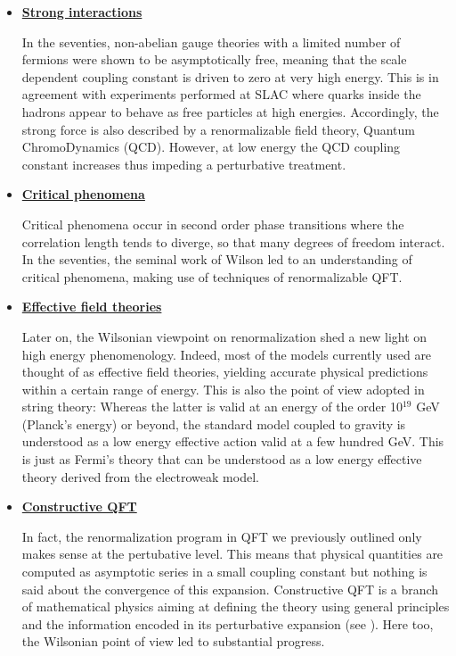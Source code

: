 \documentclass[10pt,here,feynmf]{article}
\begin{document}
\begin{itemize}
\item
\underline{\bf Strong interactions}

In the seventies, non-abelian gauge theories with a limited number of fermions were shown to be asymptotically free, meaning that the scale dependent coupling constant is driven to zero at very high energy. This is in agreement with experiments performed at SLAC where quarks inside the hadrons appear to behave as free particles at high energies. Accordingly, the strong force is also described by a renormalizable field theory, Quantum ChromoDynamics (QCD).  However, at low energy the QCD coupling constant increases thus impeding a perturbative treatment.

\item
\underline{\bf Critical phenomena}

Critical phenomena occur in second order phase transitions where the correlation length tends to diverge, so that many degrees of freedom interact. In the seventies, the seminal work of  Wilson led to an understanding of critical phenomena, making use of techniques of renormalizable QFT.    

\item
\underline{\bf Effective field theories}

Later on, the Wilsonian viewpoint on renormalization shed a new light on high energy phenomenology. Indeed, most of the models currently used are thought of as effective field theories, yielding accurate physical predictions within a certain range of energy. This is also the point of view adopted in string theory: Whereas the latter is valid at an energy of the order 10$^{19}$ GeV (Planck's energy) or beyond, the standard model coupled to gravity is understood as a low energy effective action valid at a few hundred GeV. This is just as Fermi's theory that can be understood as a low energy effective theory derived from the electroweak model.
    

\item
\underline{\bf Constructive QFT}

In fact, the renormalization program in QFT we previously outlined only makes sense at the pertubative level. This means that physical quantities are computed as asymptotic series in a small coupling constant but nothing is said about the  convergence of this expansion. Constructive QFT  is a branch of mathematical physics aiming at defining the theory using general principles and the information encoded in its perturbative expansion (see \cite{constructive}). Here too, the Wilsonian point of view led to substantial progress.  


\end{itemize}
\end{document}
